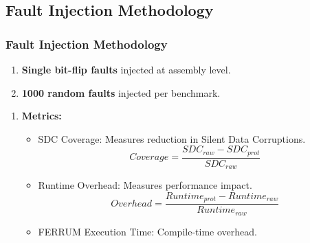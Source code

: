 \documentclass[
	12pt, %
]{beamer}
\begin{document}
\subsection{Fault Injection Methodology}
\begin{frame}
	\frametitle{Fault Injection Methodology}
	
	\begin{enumerate}
		\item \textbf{Single bit-flip faults} injected at assembly level.
		\item \textbf{1000 random faults} injected per benchmark.
	\end{enumerate}
	
	
	\begin{enumerate}
		\item \textbf{Metrics:}
		
		\begin{itemize}
			\item SDC Coverage: Measures reduction in Silent Data Corruptions. 
			$$ Coverage = \frac{SDC_{raw} - SDC_{prot} }{SDC_{raw}} $$
			
			\item Runtime Overhead: Measures performance impact. 
			$$ Overhead = \frac{Runtime_{prot} - Runtime_{raw} }{Runtime_{raw}} $$
			
			\item FERRUM Execution Time: Compile-time overhead.

		\end{itemize}
	\end{enumerate}
\end{frame}





%	
%	
%	
%	
%	
\end{document}
